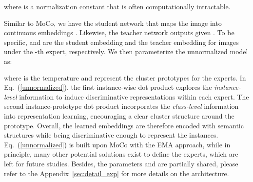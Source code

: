 \documentclass{article} \usepackage{iclr2021_conference,times}
\begin{document}
where   is a normalization constant that is often computationally intractable. 

Similar to MoCo, we have the student network  that maps the image  into  continuous embeddings . Likewise, the teacher network  outputs  given . To be specific,  and  are the student embedding and the teacher embedding for images  under the -th expert, respectively. We then parameterize the unnormalized model as:

where  is the temperature and  represent  the cluster prototypes for the experts. In 
Eq.~(\ref{unnormalized}), the first instance-wise dot product explores the \textit{instance-level} information to induce discriminative representations within each expert.
The second instance-prototype dot product incorporates the \textit{class-level} information into representation learning, encouraging a clear cluster structure around the prototype. 
Overall, the learned embeddings are therefore encoded with semantic structures while being discriminative enough to represent the instances. Eq.~(\ref{unnormalized}) is built upon MoCo with the EMA approach, while in principle, many other potential solutions exist to define the experts, which are left for future studies. Besides, the parameters  and  are partially shared, please refer to the Appendix~\ref{sec:detail_exp} for more details on the architecture.
\end{document}
